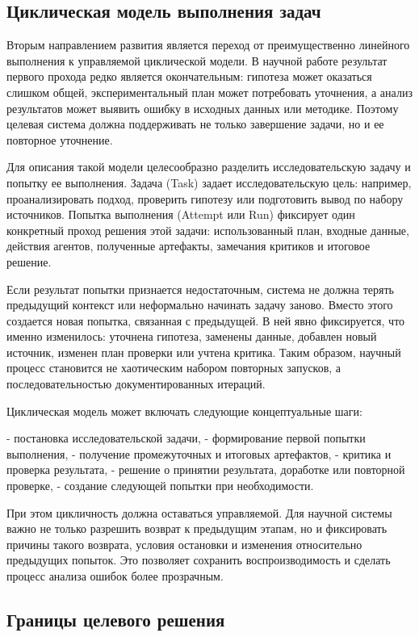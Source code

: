 \subsection{Циклическая модель выполнения задач}

Вторым направлением развития является переход от преимущественно линейного выполнения к управляемой циклической модели. В научной работе результат первого прохода редко является окончательным: гипотеза может оказаться слишком общей, экспериментальный план может потребовать уточнения, а анализ результатов может выявить ошибку в исходных данных или методике. Поэтому целевая система должна поддерживать не только завершение задачи, но и ее повторное уточнение.

Для описания такой модели целесообразно разделить исследовательскую задачу и попытку ее выполнения. Задача (Task) задает исследовательскую цель: например, проанализировать подход, проверить гипотезу или подготовить вывод по набору источников. Попытка выполнения (Attempt или Run) фиксирует один конкретный проход решения этой задачи: использованный план, входные данные, действия агентов, полученные артефакты, замечания критиков и итоговое решение.

Если результат попытки признается недостаточным, система не должна терять предыдущий контекст или неформально начинать задачу заново. Вместо этого создается новая попытка, связанная с предыдущей. В ней явно фиксируется, что именно изменилось: уточнена гипотеза, заменены данные, добавлен новый источник, изменен план проверки или учтена критика. Таким образом, научный процесс становится не хаотическим набором повторных запусков, а последовательностью документированных итераций.

Циклическая модель может включать следующие концептуальные шаги:

- постановка исследовательской задачи,
- формирование первой попытки выполнения,
- получение промежуточных и итоговых артефактов,
- критика и проверка результата,
- решение о принятии результата, доработке или повторной проверке,
- создание следующей попытки при необходимости.

При этом цикличность должна оставаться управляемой. Для научной системы важно не только разрешить возврат к предыдущим этапам, но и фиксировать причины такого возврата, условия остановки и изменения относительно предыдущих попыток. Это позволяет сохранить воспроизводимость и сделать процесс анализа ошибок более прозрачным.

\subsection{Границы целевого решения}


